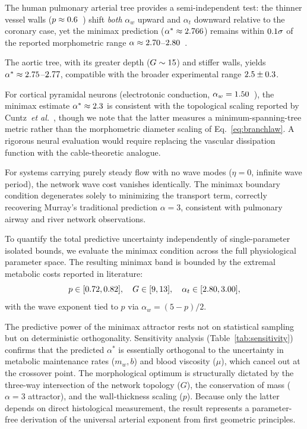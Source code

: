 \documentclass[11pt,a4paper]{article}
\theoremstyle{remark}
\begin{document}
The human pulmonary arterial tree provides a semi-independent test: the thinner
vessel walls ($p \approx 0.6$~\cite{Huang1996}) shift \emph{both}
$\alpha_w$ upward and $\alpha_t$ downward relative to the coronary case, yet the
minimax prediction ($\alpha^* \approx 2.766$) remains within
$0.1\sigma$ of the reported morphometric range $\alpha \approx
2.70$--$2.80$~\cite{Huang1996}.

The aortic tree, with its greater depth ($G \sim 15$) and stiffer
walls, yields $\alpha^* \approx
2.75$--$2.77$, compatible with the broader
experimental range $2.5 \pm 0.3$.

For cortical pyramidal neurons (electrotonic conduction, $\alpha_w =
1.50$~\cite{Rall1959}), the minimax estimate $\alpha^* \approx
2.3$ is consistent with the topological scaling reported by
Cuntz~\emph{et al.}~\cite{Cuntz2010}, though we note that the latter measures a
minimum-spanning-tree metric rather than the morphometric diameter scaling of
Eq.~\eqref{eq:branchlaw}. A rigorous neural evaluation would require replacing
the vascular dissipation function with the cable-theoretic analogue.

For systems carrying purely steady flow with no wave modes ($\eta = 0$, infinite
wave period), the network wave cost vanishes identically. The minimax boundary
condition degenerates solely to minimizing the transport term, correctly
recovering Murray's traditional prediction $\alpha = 3$, consistent with
pulmonary airway and river network observations.

To quantify the total predictive uncertainty independently of single-parameter
isolated bounds, we evaluate the minimax condition across the full physiological
parameter space. The resulting minimax band is bounded by the extremal metabolic
costs reported in literature:
\[
  p \in [0.72, 0.82], \quad G \in [9, 13], \quad \alpha_t \in [2.80, 3.00],
\]
with the wave exponent tied to $p$ via $\alpha_w = (5-p)/2$.

The predictive power of the minimax attractor rests not on statistical sampling
but on deterministic orthogonality. Sensitivity analysis
(Table~\ref{tab:sensitivity}) confirms that the predicted $\alpha^*$ is
essentially orthogonal to the uncertainty in metabolic maintenance rates ($m_w,
b$) and blood viscosity ($\mu$), which cancel out at the crossover point. The
morphological optimum is structurally dictated by the three-way intersection of
the network topology ($G$), the conservation of mass ($\alpha=3$ attractor), and
the wall-thickness scaling ($p$). Because only the latter depends on direct
histological measurement, the result represents a parameter-free derivation of
the universal arterial exponent from first geometric principles.
\end{document}
